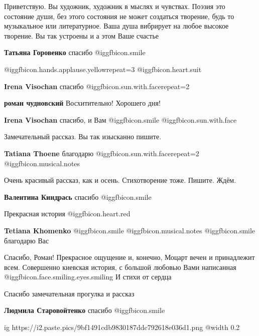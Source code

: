 \begin{itemize}

Приветствую. Вы художник, художник в мыслях и чувствах. Поэзия это состояние
души, без этого состояния не может создаться творение, будь то музыкальное или
литературное. Ваша душа вибрирует на любое высокое творение. Вы так устроены и
а этом Ваше счастье

\textbf{Татьяна Горовенко} спасибо @igg{fbicon.smile} 

 @igg{fbicon.hands.applause.yellow}{repeat=3} @igg{fbicon.heart.suit}

\begin{itemize} %
\textbf{Irena Visochan} спасибо @igg{fbicon.sun.with.face}{repeat=2} 

\textbf{роман чудновский} Восхитительно! Хорошего дня!

\textbf{Irena Visochan} спасибо, и Вам @igg{fbicon.smile}  @igg{fbicon.sun.with.face} 
\end{itemize} %

Замечательный рассказ. Вы так изысканно пишите.

\textbf{Tatiana Thoene} благодарю @igg{fbicon.sun.with.face}{repeat=2}  @igg{fbicon.musical.notes} 

Очень красивый рассказ, как и осень. Стихотворение тоже. Пишите. Ждём.

\textbf{Валентина Киндрась} спасибо @igg{fbicon.smile} 

Прекрасная история @igg{fbicon.heart.red}

\textbf{Tetiana Khomenko}  @igg{fbicon.smile}  @igg{fbicon.musical.notes}  @igg{fbicon.smile} благодарю Вас


Спасибо, Роман! Прекрасное ощущение и, конечно, Моцарт вечен и принадлежит
всем. Совершенно киевская история, с большой любовью Вами написанная  @igg{fbicon.face.smiling.eyes.smiling}  И стихи
от сердца

Спасибо замечательная прогулка и рассказ

\textbf{Людмила Старовойтенко} спасибо @igg{fbicon.smile} 


\ifcmt
  ig https://i2.paste.pics/9bf1491cdb9830187ddc792618e036d1.png
  @width 0.2
\fi


\end{itemize}
